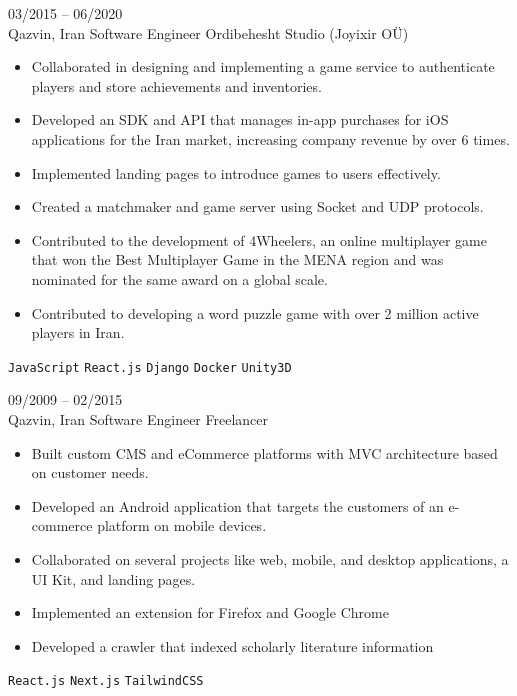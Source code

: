 \documentclass[9pt]{developercv} %
\begin{document}
\begin{entrylist}
        \entry
        {03/2015 -- 06/2020 \\ Qazvin, Iran}
        {Software Engineer}
        {Ordibehesht Studio {\small (Joyixir OÜ)}}
        {\vspace{-10pt}
            \begin{itemize}[noitemsep,topsep=0pt,parsep=0pt,partopsep=0pt, leftmargin=-1pt]
                \item Collaborated in designing and implementing a game service to authenticate players and store achievements and inventories.
                \item Developed an SDK and API that manages in-app purchases for iOS applications for the Iran market, increasing company revenue by over 6 times.
                \item Implemented landing pages to introduce games to users effectively.
                \item Created a matchmaker and game server using Socket and UDP protocols.
                \item Contributed to the development of 4Wheelers, an online multiplayer game that won the Best Multiplayer Game in the MENA region and was nominated for the same award on a global scale.
                \item Contributed to developing a word puzzle game with over 2 million active players in Iran.
            \end{itemize}
            \texttt{JavaScript} \slashsep \texttt{React.js} \slashsep \texttt{Django} \slashsep \texttt{Docker} \slashsep \texttt{Unity3D}
        }

        \entry
        {09/2009 -- 02/2015 \\ Qazvin, Iran}
        {Software Engineer}
        {Freelancer}
        {\vspace{-10pt}
            \begin{itemize}[noitemsep,topsep=0pt,parsep=0pt,partopsep=0pt, leftmargin=-1pt]
                \item Built custom CMS and eCommerce platforms with MVC architecture based on customer needs.
                \item Developed an Android application that targets the customers of an e-commerce platform on mobile devices.
                \item Collaborated on several projects like web, mobile, and desktop applications, a UI Kit, and landing pages.
                \item Implemented an extension for Firefox and Google Chrome
                \item Developed a crawler that indexed scholarly literature information
            \end{itemize}
            \texttt{React.js} \slashsep \texttt{Next.js} \slashsep \texttt{TailwindCSS}
        }
    \end{entrylist}
\end{document}
